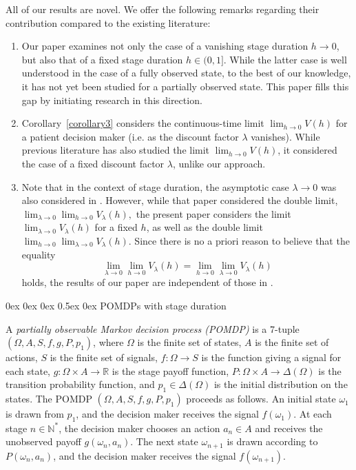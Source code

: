 \documentclass[english,openary,11pt]{article}
\makeatletter
\renewcommand\section{\@startsection {section}{1}{\z@}%
                                   {0ex \@plus 0ex \@minus 0ex}%
                                   {0.5ex \@plus0ex}%
                                   {\normalfont\LARGE\bfseries}}%
\theoremstyle{definition}
\newcommand{\R}{\mathbb{R}}
\newcommand{\N}{\mathbb{N}}
\makeatother
\begin{document}
All of our results are novel. We offer the following remarks regarding their contribution compared to the existing literature:
\begin{enumerate}
	\item Our paper examines not only the case of a vanishing stage duration $h \to 0$, but also that of a fixed stage duration $h \in (0,1]$. While the latter case is well understood in the case of a fully observed state, to the best of our knowledge, it has not yet been studied for a partially observed state. This paper fills this gap by initiating research in this direction.
		\item Corollary~\ref{corollary3} considers the continuous-time limit $\lim_{h \to 0} V(h)$ for a patient decision maker (i.e. as the discount factor $\lambda$ vanishes). While previous literature has also studied the limit $\lim_{h \to 0} V(h)$, it considered the case of a fixed discount factor $\lambda$, unlike our approach.
		\item Note that in the context of stage duration, the asymptotic case $\lambda \to 0$ was also considered in \cite{Nov24b}. However, while that paper considered the double limit, $\lim_{\lambda \to 0} \lim_{h \to 0} V_\lambda(h),$ the present paper considers the limit $\lim_{\lambda \to 0} V_\lambda(h)$ for a fixed $h$, as well as the double limit $\lim_{h \to 0} \lim_{\lambda \to 0} V_\lambda(h)$. Since there is no a priori reason to believe that the equality
$$\lim_{\lambda \to 0} \lim_{h \to 0} V_\lambda(h) = \lim_{h \to 0} \lim_{\lambda \to 0} V_\lambda(h)$$
holds, the results of our paper are independent of those in \cite{Nov24b}.
\end{enumerate}

\section{POMDPs with stage duration}

A \emph{partially observable Markov decision process (POMDP)} is a 7-tuple $(\Omega, A, S, f, g, P, p_1)$, where $\Omega$ is the finite set of states, $A$ is the finite set of actions, $S$ is the finite set of signals, $f : \Omega \to S$ is the function giving a signal for each state, $g : \Omega \times A \to \R$ is the stage payoff function, $P : \Omega \times A \to \Delta(\Omega)$ is the transition probability function, and $p_1 \in \Delta(\Omega)$ is the initial distribution on the states. The POMDP $(\Omega, A, S, f, g, P, p_1)$ proceeds as follows. An initial state $\omega_1$ is drawn from $p_1$, and the decision maker receives the signal $f(\omega_1)$. At each stage $n \in \N^*$, the decision maker chooses an action $a_n \in A$ and receives the unobserved payoff $g(\omega_n, a_n)$. The next state $\omega_{n+1}$ is drawn according to $P(\omega_n, a_n)$, and the decision maker receives the signal $f(\omega_{n+1})$.
\end{document}
